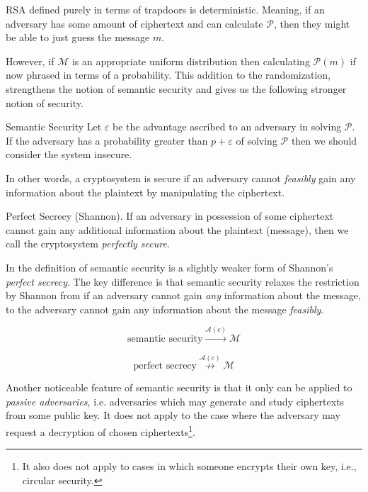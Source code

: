 \smallskip

RSA defined purely in terms of trapdoors is deterministic. Meaning, if an adversary has some amount of ciphertext and can calculate $\mathcal{P}$, then they might be able to just guess the message $m$. 

\medskip

However, if $\mathcal{M}$ is an appropriate uniform distribution then calculating $\mathcal{P}(m)$ if now phrased in terms of a probability. This addition to the randomization, strengthens the notion of semantic security and gives us the following stronger notion of security.

\medskip

\begin{defn}{Semantic Security}
    Let $\varepsilon$ be the advantage ascribed to an adversary in solving $\mathcal{P}$. If the adversary has a probability greater than $p + \varepsilon$ of solving $\mathcal{P}$ then we should consider the system insecure. 
\end{defn}

\medskip

In other words, a cryptosystem is secure if an adversary cannot \emph{feasibly} gain any information about the plaintext by manipulating the ciphertext. 

\medskip

\begin{defn}{Perfect Secrecy (Shannon). }
	If an adversary in possession of some ciphertext cannot gain any additional information about the plaintext (message), then we call the cryptosystem \emph{perfectly secure}.
\end{defn}

\medskip

In \cite{Gol1982} the definition of semantic security is a slightly weaker form of Shannon's \emph{perfect secrecy}. The key difference is that semantic security relaxes the restriction by Shannon from if an adversary cannot gain \emph{any} information about the message, to the adversary cannot gain any information about the message \emph{feasibly}. 

\medskip


\[\text{semantic security} \overset{\mathcal{A}(c)}{\longrightarrow} \mathcal{M} \] 

\[\text{perfect secrecy} \overset{\mathcal{A}(c)}{\not \longrightarrow} \mathcal{M} \]


Another noticeable feature of semantic security is that it only can be applied to \emph{passive adversaries}, i.e. adversaries which may generate and study ciphertexts from some public key. It does not apply to the case where the adversary may request a decryption of chosen ciphertexts\footnote{It also does not apply to cases in which someone encrypts their own key, i.e., circular security.}. 

